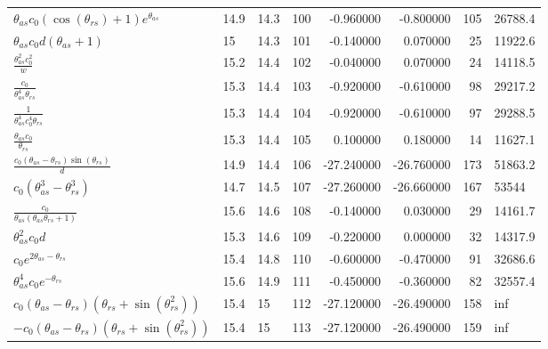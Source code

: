 \begin{tabularx}{\textwidth}{lllrrrrl}
$ \theta_{as} c_{0} \left(\cos{\left(\theta_{rs} \right)} + 1\right) e^{\theta_{as}} $  &  14.9  &  14.3  &  100  &  -0.960000  &  -0.800000  &  105  &  26788.4  \\ 
$ \theta_{as} c_{0} d \left(\theta_{as} + 1\right) $  &  15\phantom{.0}  &  14.3  &  101  &  -0.140000  &  0.070000  &  25  &  11922.6  \\ 
$ \displaystyle\frac{\theta_{as}^{2} c_{0}^{2}}{w} $  &  15.2  &  14.4  &  102  &  -0.040000  &  0.070000  &  24  &  14118.5  \\ 
$ \displaystyle\frac{c_{0}}{\theta_{as}^{4} \theta_{rs}} $  &  15.3  &  14.4  &  103  &  -0.920000  &  -0.610000  &  98  &  29217.2  \\ 
$ \displaystyle\frac{1}{\theta_{as}^{4} c_{0}^{4} \theta_{rs}} $  &  15.3  &  14.4  &  104  &  -0.920000  &  -0.610000  &  97  &  29288.5  \\ 
$ \displaystyle\frac{\theta_{as} c_{0}}{\theta_{rs}} $  &  15.3  &  14.4  &  105  &  0.100000  &  0.180000  &  14  &  11627.1  \\ 
$ \displaystyle\frac{c_{0} \left(\theta_{as} - \theta_{rs}\right) \sin{\left(\theta_{rs} \right)}}{d} $  &  14.9  &  14.4  &  106  &  -27.240000  &  -26.760000  &  173  &  51863.2  \\ 
$ c_{0} \left(\theta_{as}^{3} - \theta_{rs}^{3}\right) $  &  14.7  &  14.5  &  107  &  -27.260000  &  -26.660000  &  167  &  53544\phantom{.0}  \\ 
$ \displaystyle\frac{c_{0}}{\theta_{as} \left(\theta_{as} \theta_{rs} + 1\right)} $  &  15.6  &  14.6  &  108  &  -0.140000  &  0.030000  &  29  &  14161.7  \\ 
$ \theta_{as}^{2} c_{0} d $  &  15.3  &  14.6  &  109  &  -0.220000  &  0.000000  &  32  &  14317.9  \\ 
$ c_{0} e^{2 \theta_{as} - \theta_{rs}} $  &  15.4  &  14.8  &  110  &  -0.600000  &  -0.470000  &  91  &  32686.6  \\ 
$ \theta_{as}^{4} c_{0} e^{- \theta_{rs}} $  &  15.6  &  14.9  &  111  &  -0.450000  &  -0.360000  &  82  &  32557.4  \\ 
$ c_{0} \left(\theta_{as} - \theta_{rs}\right) \left(\theta_{rs} + \sin{\left(\theta_{rs}^{2} \right)}\right) $  &  15.4  &  15\phantom{.0}  &  112  &  -27.120000  &  -26.490000  &  158  &  inf  \\ 
$ - c_{0} \left(\theta_{as} - \theta_{rs}\right) \left(\theta_{rs} + \sin{\left(\theta_{rs}^{2} \right)}\right) $  &  15.4  &  15\phantom{.0}  &  113  &  -27.120000  &  -26.490000  &  159  &  inf  \\ 

\end{tabularx}
